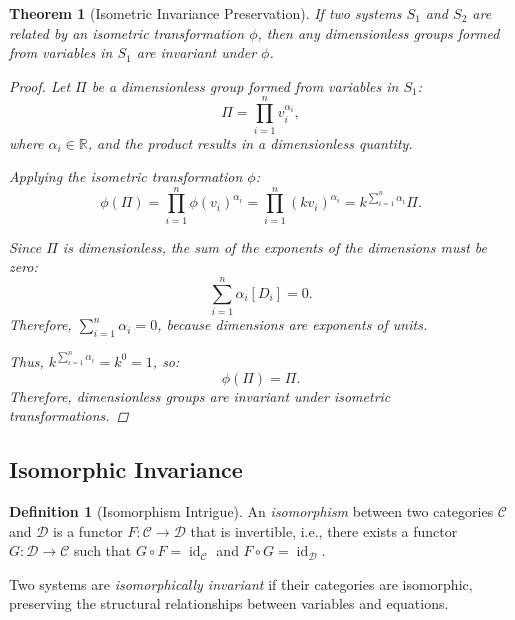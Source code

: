 \documentclass{article}
\newtheorem{theorem}{Theorem}[section]
\theoremstyle{definition}
\newtheorem{definition}{Definition}[section]
\theoremstyle{remark}
\begin{document}
	\begin{theorem}[Isometric Invariance Preservation]
		If two systems $S_1$ and $S_2$ are related by an isometric transformation $\phi$, then any dimensionless groups formed from variables in $S_1$ are invariant under $\phi$.
		
		\begin{proof}
			Let $\Pi$ be a dimensionless group formed from variables in $S_1$:
			\[
			\Pi = \prod_{i=1}^n v_i^{\alpha_i},
			\]
			where $\alpha_i \in \mathbb{R}$, and the product results in a dimensionless quantity.
			
			Applying the isometric transformation $\phi$:
			\[
			\phi(\Pi) = \prod_{i=1}^n \phi(v_i)^{\alpha_i} = \prod_{i=1}^n (k v_i)^{\alpha_i} = k^{\sum_{i=1}^n \alpha_i} \Pi.
			\]
			
			Since $\Pi$ is dimensionless, the sum of the exponents of the dimensions must be zero:
			\[
			\sum_{i=1}^n \alpha_i [D_i] = 0.
			\]
			Therefore, $\sum_{i=1}^n \alpha_i = 0$, because dimensions are exponents of units.
			
			Thus, $k^{\sum_{i=1}^n \alpha_i} = k^0 = 1$, so:
			\[
			\phi(\Pi) = \Pi.
			\]
			Therefore, dimensionless groups are invariant under isometric transformations.
		\end{proof}
	\end{theorem}
	
	\subsection{Isomorphic Invariance}
	
	\begin{definition}[Isomorphism Intrigue]
		An \emph{isomorphism} between two categories $\mathcal{C}$ and $\mathcal{D}$ is a functor $F: \mathcal{C} \rightarrow \mathcal{D}$ that is invertible, i.e., there exists a functor $G: \mathcal{D} \rightarrow \mathcal{C}$ such that $G \circ F = \operatorname{id}_{\mathcal{C}}$ and $F \circ G = \operatorname{id}_{\mathcal{D}}$.
		
		Two systems are \emph{isomorphically invariant} if their categories are isomorphic, preserving the structural relationships between variables and equations.
	\end{definition}
	
\end{document}
